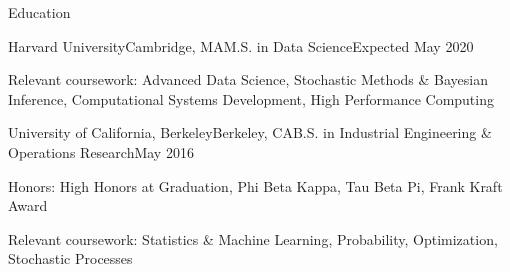 \documentclass{resume} %
\begin{document}

\begin{rSection}{Education}

\begin{rSubsection}{Harvard University}{Cambridge, MA}{M.S. in Data Science}{Expected May 2020}
\item Relevant coursework: Advanced Data Science, Stochastic Methods \& Bayesian Inference, Computational Systems Development, High Performance Computing
\end{rSubsection}


\begin{rSubsection}{University of California, Berkeley}{Berkeley, CA}{B.S. in Industrial Engineering \& Operations Research}{May 2016}
\item Honors: High Honors at Graduation, Phi Beta Kappa, Tau Beta Pi, Frank Kraft Award
\item Relevant coursework: Statistics \& Machine Learning, Probability, Optimization, Stochastic Processes
\end{rSubsection}


\end{rSection}

\end{document}

